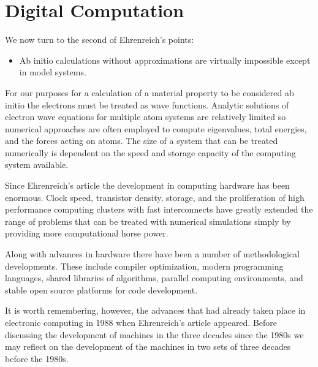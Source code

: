 \section{Digital Computation}
\label{sec:riseofcomp}
We now turn to the second of Ehrenreich's points:
%
\begin{itemize}
\item Ab initio calculations without approximations are virtually impossible 
      except in model systems.
\end{itemize}
%
For our purposes for a calculation of a material property to be considered ab initio 
the electrons must be treated as wave functions. Analytic solutions of electron wave equations
for multiple atom systems are relatively limited so numerical approaches are often employed 
to compute eigenvalues, total energies, and the forces acting on atoms. The size of a system
that can be treated numerically is dependent on the speed and storage capacity of the 
computing system available.

Since Ehrenreich's article the development in computing hardware has been enormous. 
Clock speed, transistor density, storage, and the proliferation of high 
performance computing clusters with fast interconnects have greatly extended 
the range of problems that can be treated with numerical simulations
simply by providing more computational horse power.

Along with advances in hardware there have been a number
of methodological developments. These include compiler 
optimization, modern programming languages, 
shared libraries of algorithms, parallel computing environments, and 
stable open source platforms for code development.

It is worth remembering, however, the advances that had already 
taken place in electronic computing in 1988 when Ehrenreich's article appeared.
Before discussing the development of machines in the three decades since the 1980s 
we may reflect on the development of the machines in two
sets of three decades before the 1980s. 




